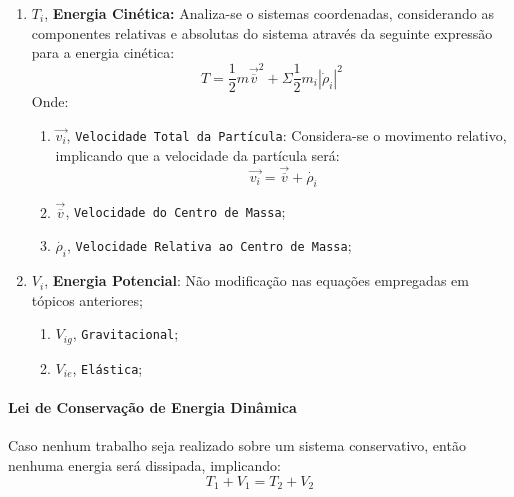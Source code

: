 \documentclass{article}
\begin{document}
                \begin{enumerate}[rightmargin = \leftmargin]
                    \item $T_{i}$, \textbf{Energia Cinética:} Analiza-se o sistemas coordenadas, considerando as componentes relativas e absolutas do sistema através da seguinte expressão para a energia cinética:
                        \begin{equation}
                            \boxed{
                                T = \frac{1}{2} m \vec{\overline{v}}^{2} + \Sigma \frac{1}{2} m_{i} |\dot{\rho}_{i}|^{2}
                            }
                        \end{equation}
                    Onde:
                        \begin{enumerate}[noitemsep]
                            \item $\vec{v_{i}}$, \texttt{Velocidade Total da Partícula}: Considera-se o movimento relativo, implicando que a velocidade da partícula será:
                                \begin{equation}
                                    \vec{v_{i}} = \vec{\overline{v}} + \dot{\rho_{i}}
                                \end{equation}
                            \item $\vec{\overline{v}}$, \texttt{Velocidade do Centro de Massa};
                            \item $\dot{\rho_{i}}$, \texttt{Velocidade Relativa ao Centro de Massa};
                        \end{enumerate}

                    \item $V_{i}$, \textbf{Energia Potencial}: Não modificação nas equações empregadas em tópicos anteriores;
                        \begin{enumerate}[noitemsep]
                            \item $V_{ig}$, \texttt{Gravitacional};
                            \item $V_{ie}$, \texttt{Elástica};
                        \end{enumerate}
                \end{enumerate}

            \paragraph{Lei de Conservação de Energia Dinâmica}Caso nenhum trabalho seja realizado sobre um sistema conservativo, então nenhuma energia será dissipada, implicando:
                \begin{equation}
                    \boxed{
                        T_{1} + V_{1} = T_{2} + V_{2}
                    }
                \end{equation}
\end{document}
